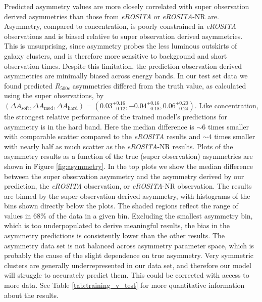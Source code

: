 \documentclass[twocolumn, 11pt]{aastex63}%
\begin{document}
Predicted asymmetry values are more closely correlated with super observation derived asymmetries than those from \textit{eROSITA} or \textit{eROSITA}-NR are. Asymmetry, compared to concentration, is poorly constrained in \textit{eROSITA} observations and is biased relative to super observation derived asymmetries. This is unsurprising, since asymmetry probes the less luminous outskirts of galaxy clusters, and is therefore more sensitive to background and short observation times. Despite this limitation, the prediction observation derived asymmetries are minimally biased across energy bands. In our test set data we found predicted $R_{500c}$ asymmetries differed from the truth value, as calculated using the super observations, by $(\Delta A_{\mathrm{soft}},\Delta A_{\mathrm{med}},\Delta A_{\mathrm{hard}}) = (0.03_{-0.12}^{+0.16}, -0.04_{-0.18}^{+0.16}, 0.06_{-0.24}^{+0.20})$. Like concentration, the strongest relative performance of the trained model's predictions for asymmetry is in the hard band. Here the median difference is $\sim6$ times smaller with comparable scatter compared to the \textit{eROSITA} results and $\sim4$ times smaller with nearly half as much scatter as the \textit{eROSITA}-NR results.  Plots of the asymmetry results as a function of the true (super observation) asymmetries are shown in Figure \ref{fig:asymmetry}. In the top plots we show the median difference between the super observation asymmetry and the asymmetry derived by our prediction, the \textit{eROSITA} observation, or \textit{eROSITA}-NR observation. The results are binned by the super observation derived asymmetry, with histograms of the bins shown directly below the plots. The shaded regions reflect the range of values in 68\% of the data in a given bin. Excluding the smallest asymmetry bin, which is too underpopulated to derive meaningful results, the bias in the asymmetry predictions is consistently lower than the other results. The asymmetry data set is not balanced across asymmetry parameter space, which is probably the cause of the slight dependence on true asymmetry. Very symmetric clusters are generally underrepresented in our data set, and therefore our model will struggle to accurately predict them. This could be corrected with access to more data. See Table \ref{tab:training_v_test} for more quantitative information about the results.
\end{document}
